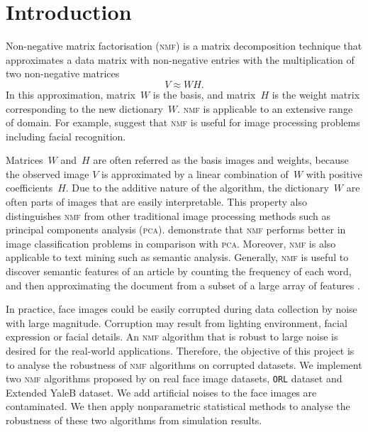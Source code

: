 \section{Introduction\label{chapter1}}
Non-negative matrix factorisation (\textsc{nmf}) is a matrix decomposition technique that approximates a data matrix with non-negative entries with the multiplication of two non-negative matrices
\begin{equation*}
  V \approx WH.
\end{equation*}
In this approximation, matrix~$W$ is the basis, and matrix~$H$ is the weight matrix corresponding to the new dictionary~$W$. \textsc{nmf}
is applicable to an extensive range of domain. For example, \citet{lee1999learning} suggest that \textsc{nmf} is useful for image processing problems including facial recognition.

Matrices~$W$ and~$H$ are often referred as the basis images and weights, 
because the observed image $V$ is approximated by a linear combination of~$W$ with positive coefficients~$H$.
Due to the additive nature of the algorithm, the dictionary~$W$ are often parts of images that are easily interpretable.
This property also distinguishes \textsc{nmf} from other traditional image processing methods such as principal components analysis (\textsc{pca}).
\citet{guillamet2002non} demonstrate that \textsc{nmf} performs better in image classification problems in comparison with \textsc{pca}.
Moreover, \textsc{nmf} is also applicable to text mining such as semantic analysis.
Generally, \textsc{nmf} is useful to discover semantic features of an article by counting the frequency of each word, and then approximating the document from a subset of a large array of features \citep{lee1999learning}.

In practice, face images could be easily corrupted during data collection by noise with large magnitude. Corruption may result from lighting environment, facial expression or facial details. An \textsc{nmf} algorithm that is robust to large noise is desired for the real-world applications. Therefore, the objective of this project is to analyse the robustness of \textsc{nmf} algorithms on corrupted datasets. We implement two \textsc{nmf} algorithms proposed by \citet{lee2001algorithms} on real face image datasets, \texttt{ORL} dataset and Extended YaleB dataset. We add artificial noises to the face images are contaminated. We then apply nonparametric statistical methods to analyse the robustness of these two algorithms from simulation results.

